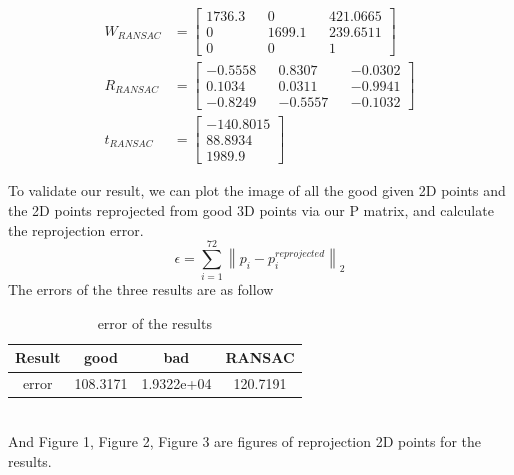 \documentclass{article}
\begin{document}
\begin{enumerate}
\begin{align*}
W_{RANSAC}&=\begin{bmatrix}1736.3&&0&&421.0665\\0&&1699.1&&239.6511\\0&&0&&1\end{bmatrix}
\\R_{RANSAC}&=\begin{bmatrix}-0.5558&&0.8307&&-0.0302\\0.1034&&0.0311&&-0.9941\\-0.8249&&-0.5557&&-0.1032\end{bmatrix}
\\t_{RANSAC}&=\begin{bmatrix}-140.8015\\88.8934\\1989.9\end{bmatrix}
\end{align*}
\end{enumerate}
To validate our result, we can plot the image of all the good given 2D points and the 2D points reprojected from good 3D points via our P matrix, and calculate the reprojection error.
\begin{equation}
\epsilon=\sum_{i=1}^{72}\left\|p_i-p_i^{reprojected}\right\|_2
\end{equation}
The errors of the three results are as follow
\begin{table}[!htbp]
\centering
\caption{error of the results}\label{tab:aStrangeTable}%
\begin{tabular}{cccc}
\hline
Result&good&bad&RANSAC\\
\hline
error&108.3171& 1.9322e+04&120.7191\\
\hline
\end{tabular}
\end{table}
\\And Figure 1, Figure 2, Figure 3 are figures of reprojection 2D points for the results.
\end{document}
